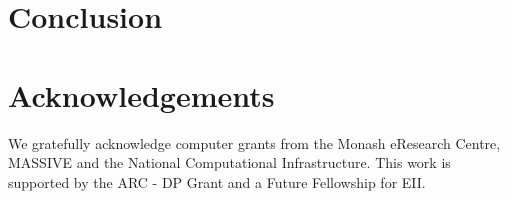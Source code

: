 \documentclass[final]{article}
\begin{document}
\begin{multicols}{2}



\section{Conclusion}


\section*{Acknowledgements}
We gratefully acknowledge computer grants from the Monash eResearch
Centre, MASSIVE and the National Computational Infrastructure. This
work is supported by the ARC - DP Grant and a Future Fellowship for EII.


\renewcommand{\bibfont}{\footnotesize}
\printbibliography

\end{multicols}

\begin{appendices}



\end{appendices}
\end{document}
